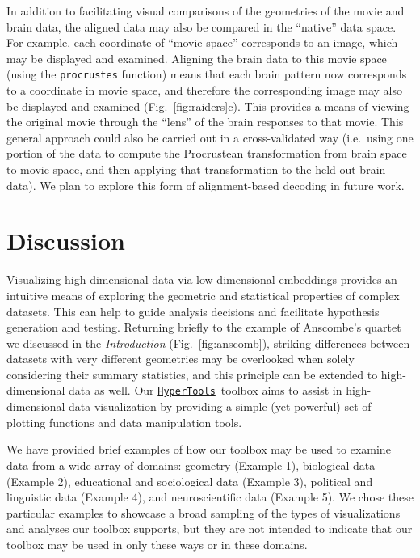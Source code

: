 \documentclass[12pt,letterpaper]{article}
\newcommand{\hypertools}{\href{https://github.com/ContextLab/hypertools}{\texttt{HyperTools}}}
\newcounter{example}
\begin{document}
In addition to facilitating visual comparisons of the geometries of the movie and brain data, the aligned data may also be compared in the ``native'' data space.  For example, each coordinate of ``movie space'' corresponds to an image, which may be displayed and examined.  Aligning the brain data to this movie space (using the \texttt{procrustes} function) means that each brain pattern now corresponds to a coordinate in movie space, and therefore the corresponding image may also be displayed and examined (Fig.~\ref{fig:raiders}c).  This provides a means of viewing the original movie through the ``lens'' of the brain responses to that movie.  This general approach could also be carried out in a cross-validated way (i.e.\ using one portion of the data to compute the Procrustean transformation from brain space to movie space, and then applying that transformation to the held-out brain data).  We plan to explore this form of alignment-based decoding in future work.





\section*{Discussion}

Visualizing high-dimensional data via low-dimensional embeddings provides an intuitive means of exploring the geometric and statistical properties of complex datasets.  This can help to guide analysis decisions and facilitate hypothesis generation and testing.  Returning briefly to the example of Anscombe's quartet we discussed in the \textit{Introduction} (Fig.~\ref{fig:anscomb}), striking differences between datasets with very different geometries may be overlooked when solely considering their summary statistics, and this principle can be extended to high-dimensional data as well.  Our \hypertools~toolbox aims to assist in high-dimensional data visualization by providing a simple (yet powerful) set of plotting functions and data manipulation tools.

We have provided brief examples of how our toolbox may be used to examine data from a wide array of domains: geometry (Example 1), biological data (Example 2), educational and sociological data (Example 3), political and linguistic data (Example 4), and neuroscientific data (Example 5).  We chose these particular examples to showcase a broad sampling of the types of visualizations and analyses our toolbox supports, but they are not intended to indicate that our toolbox may be used in only these ways or in these domains.
\end{document}

